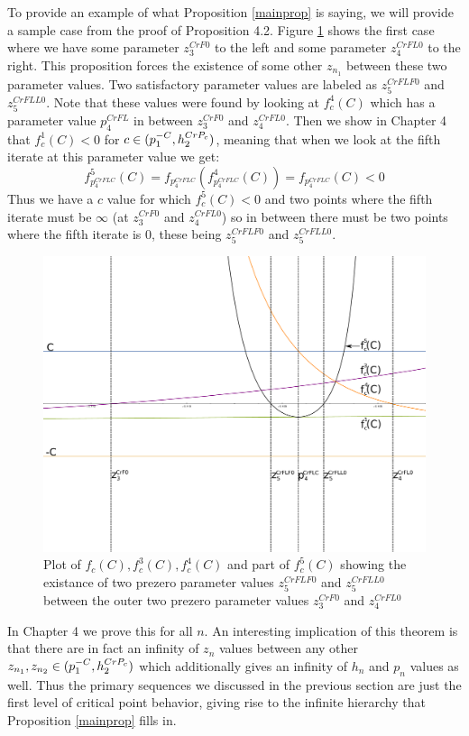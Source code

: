 To provide an example of what Proposition \ref{mainprop} is saying, we will provide a sample case from the proof of Proposition 4.2. Figure \ref{fig:case1} shows the first case where we have some parameter $z_3^{CrF0}$ to the left and some parameter $z_4^{CrFL0}$ to the right. This proposition forces the existence of some other $z_{n_1}$ between these two parameter values. Two satisfactory parameter values are labeled as $z_5^{CrFLF0}$ and $z_5^{CrFLL0}$. Note that these values were found by looking at $f^4_c (C)$ which has a parameter value $p_4^{CrFL}$ in between $z_3^{CrF0}$ and $z_4^{CrFL0}$. Then we show in Chapter 4 that $f^1_c (C) < 0$ for $c \in (p^{-C}_1, h^{CrP_c}_2)$, meaning that when we look at the fifth iterate at this parameter value we get:
\[
	f^5_{p_4^{CrFLC}} (C) = f_{p_4^{CrFLC}}\left (f^4_{p_4^{CrFLC}} (C)\right) = f_{p_4^{CrFLC}} (C) < 0
\]
Thus we have a $c$ value for which $f^5_c (C) < 0$ and two points where the fifth iterate must be $\infty$ (at $z_3^{CrF0}$ and $z_4^{CrFL0}$) so in between there must be two points where the fifth iterate is 0, these being $z_5^{CrFLF0}$ and $z_5^{CrFLL0}$. 
\begin{figure}
	\centering
	\includegraphics[width=.75\textwidth]{./img/pre0case1p}
	\caption{Plot of $f_c (C),f^3_c (C),f^4_c (C)$ and part of $f^5_c (C)$ showing the existance of two prezero parameter values $z_5^{CrFLF0}$ and $z_5^{CrFLL0}$ between the outer two prezero parameter values $z_3^{CrF0}$ and $z_4^{CrFL0}$}
	\label{fig:case1}
\end{figure}

In Chapter 4 we prove this for all $n$. An interesting implication of this theorem is that there are in fact an infinity of $z_n$ values between any other $z_{n_1}, z_{n_2} \in (p^{-C}_1, h^{CrP_c}_2)$ which additionally gives an infinity of $h_n$ and $p_n$ values as well. Thus the primary sequences we discussed in the previous section are just the first level of critical point behavior, giving rise to the infinite hierarchy that Proposition \ref{mainprop} fills in.





